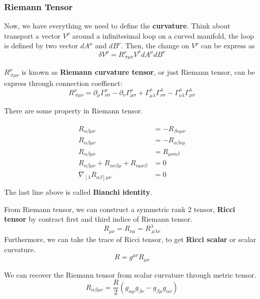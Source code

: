\documentclass[12pt]{article}
\theoremstyle{mystyle}{\newtheorem{definition}{Definition}[section]}
\theoremstyle{mystyle}{\newtheorem{theorem}[definition]{Theorem}}
\theoremstyle{mystyle}{\newtheorem*{remark}{Remark}}
\theoremstyle{mystyle}{\newtheorem*{example}{Example}}
\theoremstyle{mystyle}{\newtheorem*{examples}{Examples}}
\theoremstyle{cstyle}{\newtheorem*{cthm}{}}
\begin{document}
\subsubsection{Riemann Tensor}
Now, we have everything we need to define the \textbf{curvature}. Think about transport a vector \(V^\rho\)
around a infinitesimal loop on a curved manifold, the loop is defined by two vector \(dA^\mu\) and \(dB^\nu\).
Then, the change on \(V^\rho\) can be express as \[\delta V^\rho = R^{\rho}_{\ \sigma\mu\nu}V^{\sigma}dA^{\mu}dB^{\nu}\]
\begin{definition}
  \(R^{\rho}_{\ \sigma\mu\nu}\) is known as \textbf{Riemann curvature tensor}, or just Riemann tensor,
  can be express through connection coeffienct: \[R^{\rho}_{\ \sigma\mu\nu} =
    \partial_{\mu} \Gamma^{\rho}_{\nu\sigma} -
    \partial_{\nu} \Gamma^{\rho}_{\mu\sigma} +
    \Gamma^{\rho}_{\mu\lambda}\Gamma^{\lambda}_{\nu\sigma} -
    \Gamma^{\rho}_{\nu\lambda}\Gamma^{\lambda}_{\mu\sigma}
  \]
\end{definition}
There are some property in Riemann tensor.
\begin{cthm}
  \begin{align*}
    \begin{split}
      R_{\alpha\beta\mu\nu} &= -R_{\beta\alpha\mu\nu}\\
      R_{\alpha\beta\mu\nu} &= -R_{\alpha\beta\nu\mu}\\
      R_{\alpha\beta\mu\nu} &= R_{\mu\nu\alpha\beta}\\
      R_{\alpha\beta\mu\nu} + R_{\alpha\nu\beta\mu} + R_{\alpha\mu\nu\beta} &= 0 \\
      \nabla_{\left[ \lambda \right.} R_{\left.\alpha\beta \right] \mu\nu} &= 0 \\
    \end{split}
  \end{align*}
  The last line above is called \textbf{Bianchi identity}.
\end{cthm}
\begin{definition}
  From Riemann tensor, we can construct a symmetric rank 2 tensor, \textbf{Ricci tensor}
  by contract first and third indice of Riemann tensor.
  \[R_{\mu\nu} = R_{\nu\mu} = R^{\lambda}_{\ \mu\lambda\nu}\]
  Furthermore, we can take the trace of Ricci tensor, to get \textbf{Ricci scalar} or scalar curvature.
  \[R = g^{\mu\nu}R_{\mu\nu}\]
\end{definition}

We can recover the Riemann tensor from scalar curvature through metric tensor.
\[R_{\alpha\beta\mu\nu} = \frac{R}{2}(g_{\alpha\mu}g_{\beta\nu}-g_{\beta\mu}g_{\alpha\nu})\]
\end{document}
